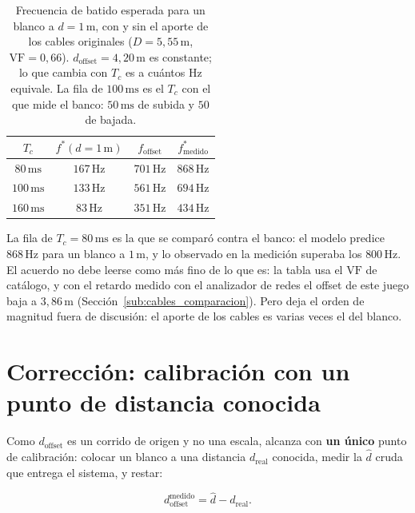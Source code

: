 \documentclass[12pt, a4paper, twoside]{report}
\begin{document}
\begin{table}[H]
  \centering
  \caption{Frecuencia de batido esperada para un blanco a
    $d = 1\,\text{m}$, con y sin el aporte de los cables originales
    ($D = 5{,}55\,\text{m}$, $\text{VF} = 0{,}66$). $d_\text{offset}
    = 4{,}20\,\text{m}$ es constante; lo que cambia con $T_c$ es a
    cuántos Hz equivale. La fila de $100\,\text{ms}$ es el $T_c$ con el
    que mide el banco: $50\,\text{ms}$ de subida y $50$ de bajada.}
  \label{tab:cables_ejemplo}
  \begin{tabular}{cccc}
    \toprule
    $T_c$ & $f^*(d=1\,\text{m})$ & $f_\text{offset}$
      & $f^*_\text{medido}$ \\
    \midrule
    $80\,\text{ms}$  &  $167\,\text{Hz}$ &  $701\,\text{Hz}$ &  $868\,\text{Hz}$ \\
    $100\,\text{ms}$ &  $133\,\text{Hz}$ &  $561\,\text{Hz}$ &  $694\,\text{Hz}$ \\
    $160\,\text{ms}$ &   $83\,\text{Hz}$ &  $351\,\text{Hz}$ &  $434\,\text{Hz}$ \\
    \bottomrule
  \end{tabular}
\end{table}

La fila de $T_c = 80\,\text{ms}$ es la que se comparó contra el banco:
el modelo predice $868\,\text{Hz}$ para un blanco a $1\,\text{m}$, y lo
observado en la medición superaba los $800\,\text{Hz}$. El acuerdo no
debe leerse como más fino de lo que es: la tabla usa el $\text{VF}$ de
catálogo, y con el retardo medido con el analizador de redes el offset
de este juego baja a $3{,}86\,\text{m}$
(Sección~\ref{sub:cables_comparacion}). Pero deja el orden de magnitud
fuera de discusión: el aporte de los cables es varias veces el del
blanco.

\section{Corrección: calibración con un punto de distancia conocida}
\label{sec:cables_calibracion}

Como $d_\text{offset}$ es un corrido de origen y no una escala, alcanza
con \textbf{un único} punto de calibración: colocar un blanco a una
distancia $d_\text{real}$ conocida, medir la $\hat d$ cruda que entrega
el sistema, y restar:

\begin{equation}
  d_\text{offset}^\text{medido} = \hat d - d_\text{real}.
  \label{eq:offset_medido}
\end{equation}
\end{document}
